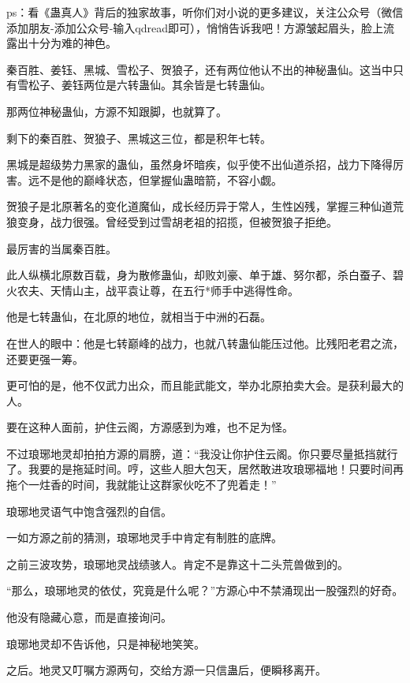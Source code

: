 
\begin{this_body}

ps：看《蛊真人》背后的独家故事，听你们对小说的更多建议，关注公众号（微信添加朋友-添加公众号-输入qdread即可），悄悄告诉我吧！方源皱起眉头，脸上流露出十分为难的神色。

秦百胜、姜钰、黑城、雪松子、贺狼子，还有两位他认不出的神秘蛊仙。这当中只有雪松子、姜钰两位是六转蛊仙。其余皆是七转蛊仙。

那两位神秘蛊仙，方源不知跟脚，也就算了。

剩下的秦百胜、贺狼子、黑城这三位，都是积年七转。

黑城是超级势力黑家的蛊仙，虽然身坏暗疾，似乎使不出仙道杀招，战力下降得厉害。远不是他的巅峰状态，但掌握仙蛊暗箭，不容小觑。

贺狼子是北原著名的变化道魔仙，成长经历异于常人，生性凶残，掌握三种仙道荒狼变身，战力很强。曾经受到过雪胡老祖的招揽，但被贺狼子拒绝。

最厉害的当属秦百胜。

此人纵横北原数百载，身为散修蛊仙，却败刘豪、单于雄、努尔都，杀白蚕子、碧火农夫、天情山主，战平袁让尊，在五行*师手中逃得性命。

他是七转蛊仙，在北原的地位，就相当于中洲的石磊。

在世人的眼中：他是七转巅峰的战力，也就八转蛊仙能压过他。比残阳老君之流，还要更强一筹。

更可怕的是，他不仅武力出众，而且能武能文，举办北原拍卖大会。是获利最大的人。

要在这种人面前，护住云阁，方源感到为难，也不足为怪。

不过琅琊地灵却拍拍方源的肩膀，道：“我没让你护住云阁。你只要尽量抵挡就行了。我要的是拖延时间。哼，这些人胆大包天，居然敢进攻琅琊福地！只要时间再拖个一炷香的时间，我就能让这群家伙吃不了兜着走！”

琅琊地灵语气中饱含强烈的自信。

一如方源之前的猜测，琅琊地灵手中肯定有制胜的底牌。

之前三波攻势，琅琊地灵战绩骇人。肯定不是靠这十二头荒兽做到的。

“那么，琅琊地灵的依仗，究竟是什么呢？”方源心中不禁涌现出一股强烈的好奇。

他没有隐藏心意，而是直接询问。

琅琊地灵却不告诉他，只是神秘地笑笑。

之后。地灵又叮嘱方源两句，交给方源一只信蛊后，便瞬移离开。


\end{this_body}
